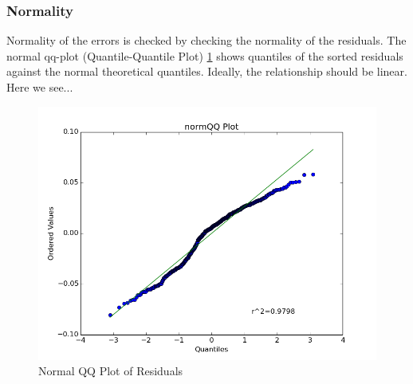 \subsubsection{Normality}
Normality of the errors is checked by checking the normality of the residuals. 
The normal qq-plot (Quantile-Quantile Plot) \ref{fig:qqplot} shows quantiles
of the sorted residuals against the normal theoretical quantiles. Ideally, the
relationship should be linear. Here we see...

\begin{figure}[ht]
\centering
\includegraphics[scale=0.5]{figures/qqplot}  
\caption{Normal QQ Plot of Residuals}
\label{fig:qqplot}
\end{figure}




